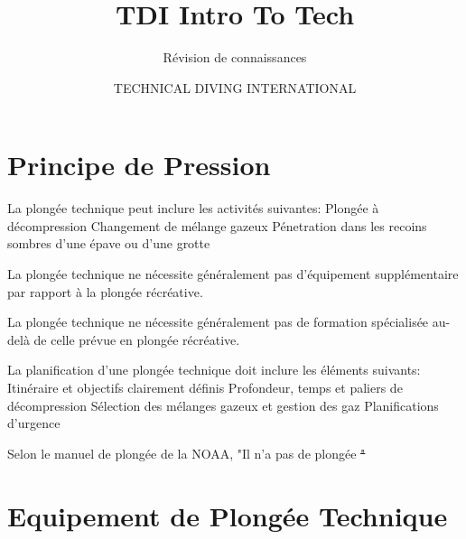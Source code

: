 \documentclass[english,10pt,a4paper]{article}
\title{TDI Intro To Tech}
\subtitle{Révision de connaissances}
\author{TECHNICAL DIVING INTERNATIONAL}
\begin{document}


	\section{Principe de Pression}

	\begin{outline}
		\1 La plongée technique peut inclure les activités suivantes:
			\2 Plongée à décompression
			\2 Changement de mélange gazeux
			\2 Pénetration dans les recoins sombres d'une épave ou d'une grotte
	
		\1 La plongée technique ne nécessite généralement pas d'équipement supplémentaire par rapport à la plongée récréative. \vf

		\1 La plongée technique ne nécessite généralement pas de formation spécialisée au-delà de celle prévue en plongée récréative. \vf

		\1 La planification d'une plongée technique doit inclure les éléments suivants:
			\2 Itinéraire et objectifs clairement définis
			\2 Profondeur, temps et paliers de décompression
			\2 Sélection des mélanges gazeux et gestion des gaz
			\2 Planifications d'urgence

		\1 Selon le manuel de plongée de la NOAA, "Il n'a pas de plongée \st "
	\end{outline}
	\pagebreak

	\section{Equipement de Plongée Technique}
\end{document}
